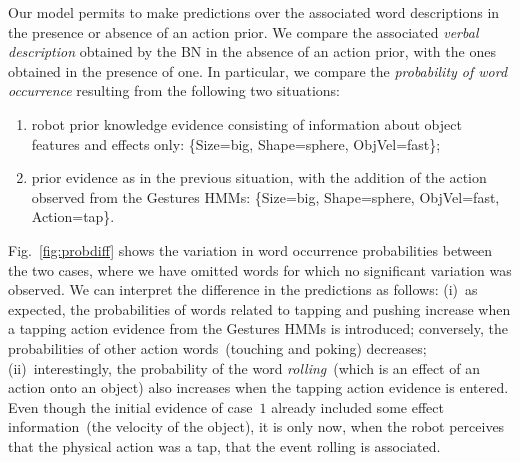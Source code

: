 Our model permits to make predictions over the associated word descriptions in the presence or absence of an action prior.
We compare the associated \emph{verbal description} obtained by the \acl{BN} in the absence of an action prior, with the ones obtained in the presence of one.
In particular, we compare the \emph{probability of word occurrence} resulting from the following two situations:
\begin{enumerate}
\item robot prior knowledge evidence consisting of information about object features and effects only: %
\{Size=big, Shape=sphere, ObjVel=fast\};

\item prior evidence as in the previous situation, with the addition of the action observed from the Gestures \acp{HMM}: %
\{Size=big, Shape=sphere, ObjVel=fast, Action=tap\}.
\end{enumerate}

Fig.~\ref{fig:probdiff} shows the variation in word occurrence probabilities between the two cases, where we have omitted words for which no significant variation was observed.
We can interpret the difference in the predictions as follows: (i)~as expected, the probabilities of words related to tapping and pushing increase when a tapping action evidence from the Gestures \acp{HMM} is introduced; conversely, the probabilities of other action words~(touching and poking) decreases; (ii)~interestingly, the probability of the word \emph{rolling}~(which is an effect of an action onto an object) also increases when the tapping action evidence is entered. Even though the initial evidence of case~$1$ already included some effect information~(the velocity of the object), it is only now, when the robot perceives that the physical action was a tap, that the event rolling is associated.

